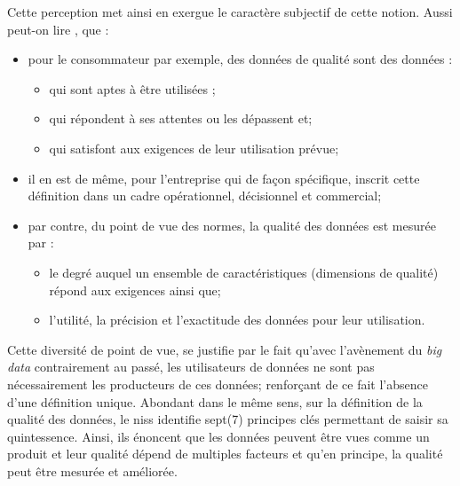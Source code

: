 Cette perception met ainsi en exergue le caract\`ere subjectif de cette notion. Aussi peut-on lire \cite{WikiDQ}, que : 
\begin{itemize}[parsep=0cm,itemsep=0cm]
\item pour le consommateur par exemple, des donn\'ees de qualit\'e sont des données : 
\begin{itemize}[parsep=0cm,itemsep=0cm]
\item qui sont aptes à être utilisées ;
\item qui répondent \`a ses attentes ou les dépassent et;
\item  qui satisfont aux exigences de leur utilisation prévue;
\end{itemize}
\item il en est de m\^eme, pour l'entreprise qui de façon sp\'ecifique, inscrit cette d\'efinition dans un cadre op\'erationnel, d\'ecisionnel et commercial;
\item par contre, du point de vue des normes, la qualit\'e des donn\'ees est mesur\'ee par :
\begin{itemize}[parsep=0cm,itemsep=0cm]
\item le degré auquel un ensemble de caractéristiques (dimensions de qualité) répond aux exigences ainsi que;
\item l'utilité, la précision et l'exactitude des données pour leur utilisation.
\end{itemize}
\end{itemize}

Cette diversit\'e de point de vue, se justifie par le fait qu'avec l'av\`enement du \textit{big data} contrairement au pass\'e, les utilisateurs de données ne sont pas nécessairement les producteurs de ces données; renforçant de ce fait l'absence d'une d\'efinition unique. Abondant dans le m\^eme sens, sur la d\'efinition de la qualit\'e des donn\'ees, le \acrfull{niss} \cite{NISS_2001} identifie sept(7) principes cl\'es permettant de saisir sa quintessence. Ainsi, ils \'enoncent que les donn\'ees peuvent \^etre vues comme un produit et leur qualit\'e  d\'epend de multiples facteurs et qu'en principe, la qualit\'e peut \^etre  mesurée et améliorée.
\\

